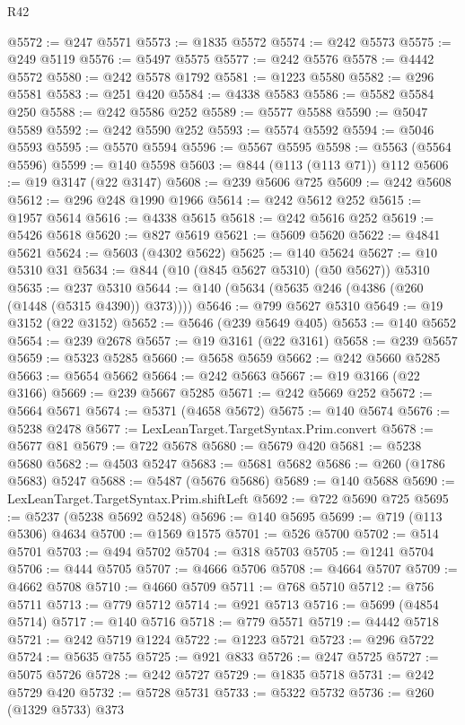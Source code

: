 \begin{lexlean}{R42}
\begin{coremodule}
{@5572 := @247 @5571
@5573 := @1835 @5572
@5574 := @242 @5573
@5575 := @249 @5119
@5576 := @5497 @5575
@5577 := @242 @5576
@5578 := @4442 @5572
@5580 := @242 @5578 @1792
@5581 := @1223 @5580
@5582 := @296 @5581
@5583 := @251 @420
@5584 := @4338 @5583
@5586 := @5582 @5584 @250
@5588 := @242 @5586 @252
@5589 := @5577 @5588
@5590 := @5047 @5589
@5592 := @242 @5590 @252
@5593 := @5574 @5592
@5594 := @5046 @5593
@5595 := @5570 @5594
@5596 := @5567 @5595
@5598 := @5563 (@5564 @5596)
@5599 := @140 @5598
@5603 := @844 (@113 (@113 @71)) @112
@5606 := @19 @3147 (@22 @3147)
@5608 := @239 @5606 @725
@5609 := @242 @5608
@5612 := @296 @248 @1990 @1966
@5614 := @242 @5612 @252
@5615 := @1957 @5614
@5616 := @4338 @5615
@5618 := @242 @5616 @252
@5619 := @5426 @5618
@5620 := @827 @5619
@5621 := @5609 @5620
@5622 := @4841 @5621
@5624 := @5603 (@4302 @5622)
@5625 := @140 @5624
@5627 := @10 @5310 @31
@5634 := @844 (@10 (@845 @5627 @5310) (@50 @5627)) @5310
@5635 := @237 @5310
@5644 := @140 (@5634 (@5635 @246 (@4386 (@260 (@1448 (@5315 @4390)) @373))))
@5646 := @799 @5627 @5310
@5649 := @19 @3152 (@22 @3152)
@5652 := @5646 (@239 @5649 @405)
@5653 := @140 @5652
@5654 := @239 @2678
@5657 := @19 @3161 (@22 @3161)
@5658 := @239 @5657
@5659 := @5323 @5285
@5660 := @5658 @5659
@5662 := @242 @5660 @5285
@5663 := @5654 @5662
@5664 := @242 @5663
@5667 := @19 @3166 (@22 @3166)
@5669 := @239 @5667 @5285
@5671 := @242 @5669 @252
@5672 := @5664 @5671
@5674 := @5371 (@4658 @5672)
@5675 := @140 @5674
@5676 := @5238 @2478
@5677 := LexLeanTarget.TargetSyntax.Prim.convert
@5678 := @5677 @81
@5679 := @722 @5678
@5680 := @5679 @420
@5681 := @5238 @5680
@5682 := @4503 @5247
@5683 := @5681 @5682
@5686 := @260 (@1786 @5683) @5247
@5688 := @5487 (@5676 @5686)
@5689 := @140 @5688
@5690 := LexLeanTarget.TargetSyntax.Prim.shiftLeft
@5692 := @722 @5690 @725
@5695 := @5237 (@5238 @5692 @5248)
@5696 := @140 @5695
@5699 := @719 (@113 @5306) @4634
@5700 := @1569 @1575
@5701 := @526 @5700
@5702 := @514 @5701
@5703 := @494 @5702
@5704 := @318 @5703
@5705 := @1241 @5704
@5706 := @444 @5705
@5707 := @4666 @5706
@5708 := @4664 @5707
@5709 := @4662 @5708
@5710 := @4660 @5709
@5711 := @768 @5710
@5712 := @756 @5711
@5713 := @779 @5712
@5714 := @921 @5713
@5716 := @5699 (@4854 @5714)
@5717 := @140 @5716
@5718 := @779 @5571
@5719 := @4442 @5718
@5721 := @242 @5719 @1224
@5722 := @1223 @5721
@5723 := @296 @5722
@5724 := @5635 @755
@5725 := @921 @833
@5726 := @247 @5725
@5727 := @5075 @5726
@5728 := @242 @5727
@5729 := @1835 @5718
@5731 := @242 @5729 @420
@5732 := @5728 @5731
@5733 := @5322 @5732
@5736 := @260 (@1329 @5733) @373
}
\end{coremodule}
\end{lexlean}
